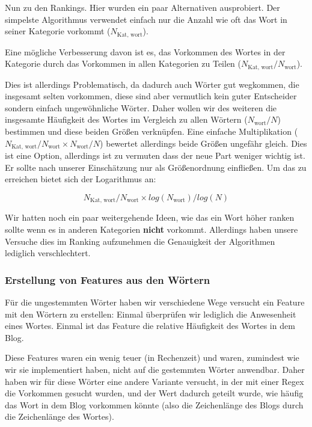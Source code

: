 \documentclass[
	11pt,
	a4paper
]{scrartcl}
\begin{document}
Nun zu den Rankings. Hier wurden ein paar Alternativen ausprobiert. 
Der simpelste Algorithmus verwendet einfach nur die Anzahl wie oft das Wort in seiner Kategorie vorkommt ($N_{\text{Kat, wort}}$).

Eine mögliche Verbesserung davon ist es, das Vorkommen des Wortes in der Kategorie durch das Vorkommen in allen Kategorien zu Teilen ($N_{\text{Kat, wort}} / N_{\text{wort}}$). 

Dies ist allerdings Problematisch, da dadurch auch Wörter gut wegkommen, die insgesamt selten vorkommen, diese sind aber vermutlich kein guter Entscheider sondern einfach ungewöhnliche Wörter.
Daher wollen wir des weiteren die insgesamte Häufigkeit des Wortes im Vergleich zu allen Wörtern ($N_{\text{wort}} / N$) bestimmen und diese beiden Größen verknüpfen.
Eine einfache Multiplikation ($N_{\text{Kat, wort}} / N_{\text{wort}} \times N_{\text{wort}} / N$)
bewertet allerdings beide Größen ungefähr gleich. 
Dies ist eine Option, allerdings ist zu vermuten dass der neue Part weniger wichtig ist. 
Er sollte nach unserer Einschätzung nur als Größenordnung einfließen. 
Um das zu erreichen bietet sich der Logarithmus an:

\begin{equation} \label{eq-log}
	N_{\text{Kat, wort}} / N_{\text{wort}} \times log(N_{\text{wort}}) / log(N)
\end{equation}

Wir hatten noch ein paar weitergehende Ideen, wie das ein Wort höher ranken sollte wenn es in anderen Kategorien \textbf{nicht} vorkommt. 
Allerdings haben unsere Versuche dies im Ranking aufzunehmen die Genauigkeit der Algorithmen lediglich verschlechtert.

\subsubsection{Erstellung von Features aus den Wörtern}

Für die ungestemmten Wörter haben wir verschiedene Wege versucht ein Feature mit den Wörtern zu erstellen:
Einmal überprüfen wir lediglich die Anwesenheit eines Wortes.
Einmal ist das Feature die relative Häufigkeit des Wortes in dem Blog.

Diese Features waren ein wenig teuer (in Rechenzeit) und waren, zumindest wie wir sie implementiert haben, nicht auf die gestemmten Wörter anwendbar.
Daher haben wir für diese Wörter eine andere Variante versucht, in der mit einer Regex die Vorkommen gesucht wurden, 
und der Wert dadurch geteilt wurde, wie häufig das Wort in dem Blog vorkommen könnte (also die Zeichenlänge des Blogs durch die Zeichenlänge des Wortes).
\end{document}
